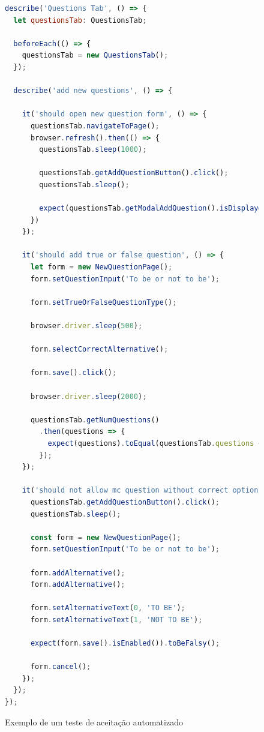 \begin{figure}[!ht]
  \caption{Exemplo de um teste de aceitação automatizado}
  \label{fig:testes_automatizados}
  \begin{lstlisting}[language=JavaScript]
describe('Questions Tab', () => {
  let questionsTab: QuestionsTab;

  beforeEach(() => {
    questionsTab = new QuestionsTab();
  });

  describe('add new questions', () => {

    it('should open new question form', () => {
      questionsTab.navigateToPage();
      browser.refresh().then(() => {
        questionsTab.sleep(1000);

        questionsTab.getAddQuestionButton().click();
        questionsTab.sleep();

        expect(questionsTab.getModalAddQuestion().isDisplayed()).toBeTruthy();
      })
    });

    it('should add true or false question', () => {
      let form = new NewQuestionPage();
      form.setQuestionInput('To be or not to be');

      form.setTrueOrFalseQuestionType();

      browser.driver.sleep(500);

      form.selectCorrectAlternative();

      form.save().click();

      browser.driver.sleep(2000);

      questionsTab.getNumQuestions()
        .then(questions => {
          expect(questions).toEqual(questionsTab.questions + 1);
        });
    });

    it('should not allow mc question without correct option', () => {
      questionsTab.getAddQuestionButton().click();
      questionsTab.sleep();

      const form = new NewQuestionPage();
      form.setQuestionInput('To be or not to be');

      form.addAlternative();
      form.addAlternative();

      form.setAlternativeText(0, 'TO BE');
      form.setAlternativeText(1, 'NOT TO BE');

      expect(form.save().isEnabled()).toBeFalsy();

      form.cancel();
    });
  });
});
\end{lstlisting}
\doautor
\end{figure}

